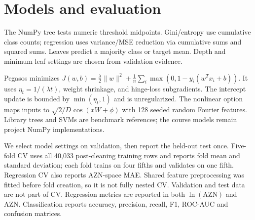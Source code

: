 \documentclass[10pt,twocolumn,a4paper]{article}
\begin{document}
\section{Models and evaluation}
The NumPy tree tests numeric threshold midpoints. Gini/entropy use cumulative class counts; regression uses variance/MSE reduction via cumulative sums and squared sums. Leaves predict a majority class or target mean. Depth and minimum leaf settings are chosen from validation evidence.

Pegasos minimizes $J(w,b)=\frac{\lambda}{2}\|w\|^2+\frac{1}{n}\sum_i\max(0,1-y_i(w^Tx_i+b))$. It uses $\eta_t=1/(\lambda t)$, weight shrinkage, and hinge-loss subgradients. The intercept update is bounded by $\min(\eta_t,1)$ and is unregularized. The nonlinear option maps inputs to $\sqrt{2/D}\cos(xW+\phi)$ with 128 seeded random Fourier features. Library trees and SVMs are benchmark references; the course models remain project NumPy implementations.

We select model settings on validation, then report the held-out test once. Five-fold CV uses all 40,033 post-cleaning training rows and reports fold mean and standard deviation; each fold trains on four fifths and validates on one fifth. Regression CV also reports AZN-space MAE. Shared feature preprocessing was fitted before fold creation, so it is not fully nested CV. Validation and test data are not part of CV. Regression metrics are reported in both $\ln(\mathrm{AZN})$ and AZN. Classification reports accuracy, precision, recall, F1, ROC-AUC and confusion matrices.
\end{document}
